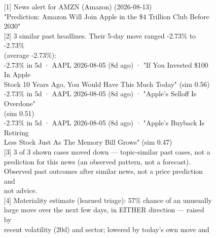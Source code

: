 \begin{figure}[htbp]
\centering
\begin{tcolorbox}[colback=black!3, colframe=black!35, boxrule=0.4pt, arc=2pt,
                  width=0.97\textwidth, fontupper=\ttfamily\scriptsize]
\textcolor{black!55}{[1]} News alert for AMZN (Amazon) (2026-08-13)\\
\hspace*{1em}"Prediction: Amazon Will Join Apple in the \$4 Trillion Club Before 2030"\\[4pt]
\textcolor{black!55}{[2]} 3 similar past headlines. Their 5-day move ranged -2.73\% to -2.73\%\\
\hspace*{1em}(average -2.73\%):\\
\hspace*{1em}-2.73\% in 5d · AAPL 2026-08-05 (8d ago) · "If You Invested \$100 In Apple\\
\hspace*{2em}Stock 10 Years Ago, You Would Have This Much Today" (sim 0.56)\\
\hspace*{1em}-2.73\% in 5d · AAPL 2026-08-05 (8d ago) · "Apple's Selloff Is Overdone"\\
\hspace*{2em}(sim 0.51)\\
\hspace*{1em}-2.73\% in 5d · AAPL 2026-08-05 (8d ago) · "Apple's Buyback Is Retiring\\
\hspace*{2em}Less Stock Just As The Memory Bill Grows" (sim 0.47)\\[4pt]
\textcolor{black!55}{[3]} 3 of 3 shown cases moved down — topic-similar past cases, not a\\
\hspace*{1em}prediction for this news (an observed pattern, not a forecast).\\
\hspace*{1em}Observed past outcomes after similar news, not a price prediction and\\
\hspace*{1em}not advice.\\[4pt]
\textcolor{black!55}{[4]} Materiality estimate (learned triage): 57\% chance of an unusually\\
\hspace*{1em}large move over the next few days, in EITHER direction — raised by\\
\hspace*{1em}recent volatility (20d) and sector; lowered by today's own move and\\

\end{tcolorbox}
\end{figure}
